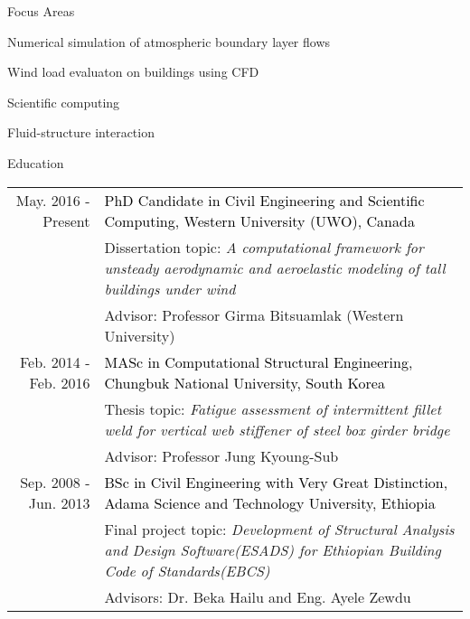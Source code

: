 \documentclass{resume} %
\begin{document}

\begin{rSection}{Focus Areas}
\begin{itemize*}
  \item Numerical simulation of atmospheric boundary layer flows\\  
  \item Wind load evaluaton on buildings using CFD\\  
  \item Scientific computing \\  
  \item Fluid-structure interaction \\  

\end{itemize*}

\end{rSection}


\begin{rSection}{Education}
\begin{tabular}{r|p{14cm}}

\footnotesize{May. 2016 - Present} & \textcolor{black} {PhD Candidate in Civil Engineering and Scientific Computing, Western University (UWO), Canada} \\&\footnotesize{Dissertation topic}: \emph{A computational framework for unsteady aerodynamic and aeroelastic modeling of tall buildings under wind } \\&\footnotesize{Advisor}: Professor Girma Bitsuamlak (Western University)\multicolumn{2}{c}{}\\
 
\footnotesize{Feb. 2014 - Feb. 2016} & \textcolor{black} {MASc in Computational Structural Engineering, Chungbuk National University, South Korea} \\&\footnotesize{Thesis topic}: \emph{Fatigue assessment of intermittent fillet weld for vertical web stiffener of steel box girder bridge}\\&\footnotesize{Advisor}: Professor Jung Kyoung-Sub\multicolumn{2}{c}{} \\
 
 
\footnotesize{Sep. 2008 - Jun. 2013} & \textcolor{black} {BSc in Civil Engineering with Very Great Distinction, Adama Science and Technology University, Ethiopia} \\&\footnotesize{Final project topic}: \emph{Development of Structural Analysis and Design Software(ESADS) for Ethiopian Building Code of Standards(EBCS)}\\&\footnotesize{Advisors}: Dr. Beka Hailu and Eng. Ayele Zewdu\multicolumn{2}{c}{} \\

\end{tabular}
\end{rSection}
\end{document}
